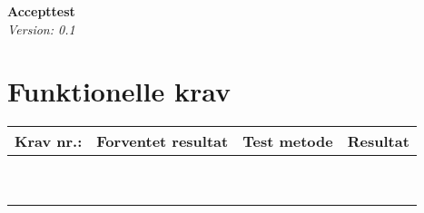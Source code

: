\documentclass[11pt]{article}
\begin{document}
	\begin{titlepage}
		\begin{center}
			\Large\textbf{Accepttest}\\
			\large\textit{Version: 0.1}
		\end{center}
	\end{titlepage}
	
	\tableofcontents
	\newpage
	
	\section{Funktionelle krav}
	
		\begin{center}
			\begin{tabular}{ | m{3cm} | m{3cm}| m{3cm}| m{3cm}| }
			\hline
			Krav nr.: & Forventet resultat & Test metode & Resultat  \\
			\hline
		    &  &  &   \\
			\hline
			&  &  &  \\
			\hline
			&  &  &  \\
			\hline
			&  &  &   \\
			\hline
			&  &  &  \\
			\hline
			&  &  &  \\
			\hline
			&  &  &   \\
			\hline
			&  &  &  \\
			\hline
			&  &  &  \\
			\hline
		\end{tabular}
		\end{center}

	
	
\end{document}
